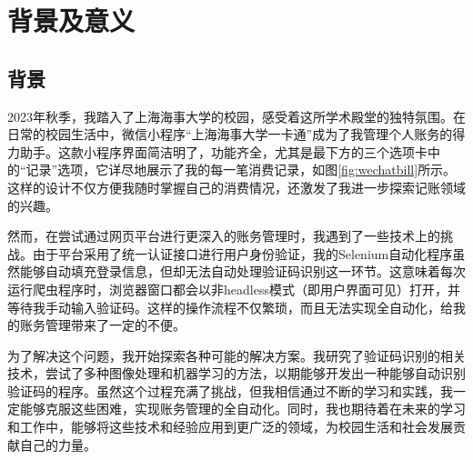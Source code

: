 \chapter{背景及意义}
\label{chapter:1}

\section{背景}

2023年秋季，我踏入了上海海事大学的校园，感受着这所学术殿堂的独特氛围。在日常的校园生活中，微信小程序“上海海事大学一卡通”成为了我管理个人账务的得力助手。这款小程序界面简洁明了，功能齐全，尤其是最下方的三个选项卡中的“记录”选项，它详尽地展示了我的每一笔消费记录，如图\ref{fig:wechatbill}所示。这样的设计不仅方便我随时掌握自己的消费情况，还激发了我进一步探索记账领域的兴趣。

然而，在尝试通过网页平台进行更深入的账务管理时，我遇到了一些技术上的挑战。由于平台采用了统一认证接口进行用户身份验证，我的Selenium自动化程序虽然能够自动填充登录信息，但却无法自动处理验证码识别这一环节。这意味着每次运行爬虫程序时，浏览器窗口都会以非headless模式（即用户界面可见）打开，并等待我手动输入验证码。这样的操作流程不仅繁琐，而且无法实现全自动化，给我的账务管理带来了一定的不便。

为了解决这个问题，我开始探索各种可能的解决方案。我研究了验证码识别的相关技术，尝试了多种图像处理和机器学习的方法，以期能够开发出一种能够自动识别验证码的程序。虽然这个过程充满了挑战，但我相信通过不断的学习和实践，我一定能够克服这些困难，实现账务管理的全自动化。同时，我也期待着在未来的学习和工作中，能够将这些技术和经验应用到更广泛的领域，为校园生活和社会发展贡献自己的力量。

